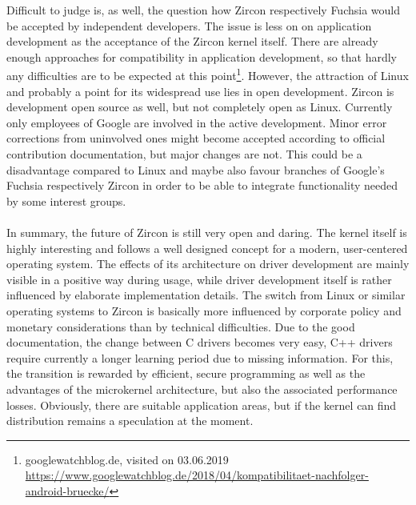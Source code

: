 Difficult to judge is, as well, the question how Zircon respectively Fuchsia would be accepted by independent developers.
The issue is less on on application development as the acceptance of the Zircon kernel itself.
There are already enough approaches for compatibility in application development, so that hardly any difficulties are to be expected at this point\footnote{googlewatchblog.de, visited on 03.06.2019 \url{https://www.googlewatchblog.de/2018/04/kompatibilitaet-nachfolger-android-bruecke/}}.
However, the attraction of Linux and probably a point for its widespread use lies in open development.
Zircon is development open source as well, but not completely open as Linux.
Currently only employees of Google are involved in the active development.
Minor error corrections from uninvolved ones might become accepted according to official contribution documentation, but major changes are not.
This could be a disadvantage compared to Linux and maybe also favour branches of Google's Fuchsia respectively Zircon in order to be able to integrate functionality needed by some interest groups.
\\
\\
In summary, the future of Zircon is still very open and daring.
The kernel itself is highly interesting and follows a well designed concept for a modern, user-centered operating system.
The effects of its architecture on driver development are mainly visible in a positive way during usage, while driver development itself is rather influenced by  elaborate implementation details.
The switch from Linux or similar operating systems to Zircon is basically more influenced by corporate policy and monetary considerations than by technical difficulties.
Due to the good documentation, the change between C drivers becomes very easy, C++ drivers require currently a longer learning period due to missing information.
For this, the transition is rewarded by efficient, secure programming as well as the advantages of the microkernel architecture, but also the associated performance losses.
Obviously, there are suitable application areas, but if the kernel can find distribution remains a speculation at the moment.


